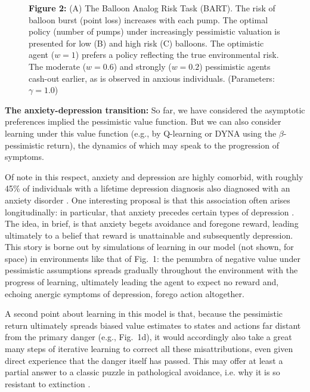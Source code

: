\documentclass[11pt]{article} %
\begin{document}
\begin{figure}
  \centerline{%
  }
  \par \textbf{Figure 2:} (A) The Balloon Analog Risk Task (BART). The risk of balloon burst (point loss) increases with each pump. The optimal policy (number of pumps) under increasingly pessimistic valuation is presented for low (B) and high risk (C) balloons. The optimistic agent ($w=1$) prefers a policy reflecting the true environmental risk. The moderate ($w=0.6$) and strongly ($w=0.2$) pessimistic agents cash-out earlier, as is observed in anxious individuals. (Parameters: $\gamma = 1.0$)
\end{figure}

\textbf{The anxiety-depression transition:} So far, we have considered the asymptotic preferences implied the pessimistic value function. But we can also consider learning under this value function (e.g., by Q-learning or DYNA using the $\beta$-pessimistic return), the dynamics of which may speak to the progression of symptoms. 

Of note in this respect, anxiety and depression are highly comorbid, with roughly 45\% of individuals with a lifetime depression diagnosis also diagnosed with an anxiety disorder \citep{kessler2015}. One interesting proposal is that this association often arises longitudinally: in particular, that anxiety precedes certain types of depression \citep{alloy1990, jacobson2014}. The idea, in brief, is that anxiety begets avoidance and foregone reward, leading ultimately to a belief that reward is unattainable and subsequently depression. This story is borne out by simulations of learning in our model (not shown, for space) in environments like that of Fig.~1: the penumbra of negative value under pessimistic assumptions spreads gradually throughout the environment with the progress of learning, ultimately leading the agent to expect no reward and, echoing anergic symptoms of depression, forego action altogether.

A second point about learning in this model is that, because the pessimistic return ultimately spreads biased value estimates to states and actions far distant from the primary danger (e.g., Fig.~1d), it would accordingly also take a great many steps of iterative learning to correct all these misattributions, even given direct experience that the danger itself has passed. This may offer at least a partial answer to a classic puzzle in pathological avoidance, i.e. why it is so resistant to extinction \cite{moutoussis2018}.
\end{document}
